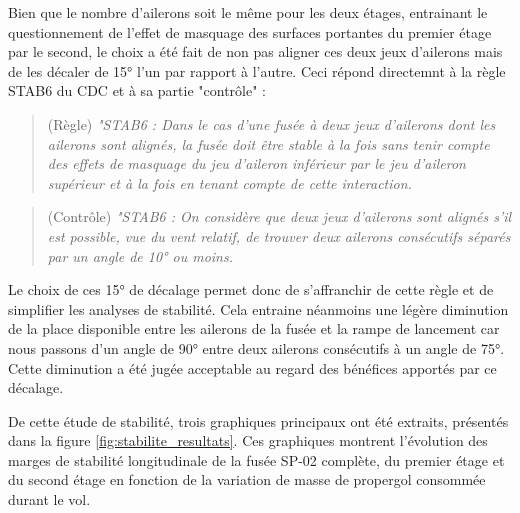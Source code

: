 Bien que le nombre d'ailerons soit le même pour les deux étages, entrainant le questionnement de l'effet de masquage des
surfaces portantes du premier étage par le second, le choix a été fait de non pas aligner ces deux jeux d'ailerons mais de les
décaler de 15° l'un par rapport à l'autre. Ceci répond directemnt à la règle STAB6 du \acrshort{CDC} et à sa partie "contrôle" :

\begin{quote}
    (Règle) \textit{"STAB6 : Dans le cas d’une fusée à deux jeux d’ailerons dont les ailerons sont alignés, la fusée doit être
    stable à la fois sans tenir compte des effets de masquage du jeu d’aileron inférieur par le jeu d’aileron supérieur et à la
    fois en tenant compte de cette interaction.}\newline\cite[p.~34]{CDC_BiEtage}
\end{quote}

\begin{quote}
    (Contrôle) \textit{"STAB6 : On considère que deux jeux d’ailerons sont alignés s’il est possible, vue du vent relatif, de
    trouver deux ailerons consécutifs séparés par un angle de 10° ou moins.}\newline\cite[p.~34]{CDC_BiEtage}
\end{quote}

Le choix de ces 15° de décalage permet donc de s'affranchir de cette règle et de simplifier les analyses de stabilité. Cela
entraine néanmoins une légère diminution de la place disponible entre les ailerons de la fusée et la rampe de lancement car nous
passons d'un angle de 90° entre deux ailerons consécutifs à un angle de 75°. Cette diminution a été jugée acceptable au regard
des bénéfices apportés par ce décalage.\\


De cette étude de stabilité, trois graphiques principaux ont été extraits, présentés dans la figure \ref{fig:stabilite_resultats}.
Ces graphiques montrent l'évolution des marges de stabilité longitudinale de la fusée SP-02 complète, du premier étage et du
second étage en fonction de la variation de masse de propergol consommée durant le vol.\\

